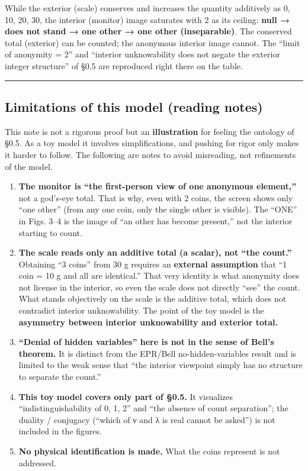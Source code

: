 \documentclass[11pt]{ltjsarticle}
\begin{document}
While the exterior (scale) conserves and increases the quantity
additively as 0, 10, 20, 30, the interior (monitor) image saturates with
2 as its ceiling: \textbf{null → does not stand → one other → one other
(inseparable)}. The conserved total (exterior) can be counted; the
anonymous interior image cannot. The ``limit of anonymity = 2'' and
``interior unknowability does not negate the exterior integer
structure'' of §0.5 are reproduced right there on the table.

\begin{center}\rule{0.5\linewidth}{0.5pt}\end{center}

\subsection{Limitations of this model (reading
notes)}\label{limitations-of-this-model-reading-notes}

This note is not a rigorous proof but an \textbf{illustration} for
feeling the ontology of §0.5. As a toy model it involves
simplifications, and pushing for rigor only makes it harder to follow.
The following are notes to avoid misreading, not refinements of the
model.

\begin{enumerate}
\def\labelenumi{\arabic{enumi}.}
\item
  \textbf{The monitor is ``the first-person view of one anonymous
  element,''} not a god's-eye total. That is why, even with 2 coins, the
  screen shows only ``one other'' (from any one coin, only the single
  other is visible). The ``ONE'' in Figs. 3--4 is the image of ``an
  other has become present,'' not the interior starting to count.
\item
  \textbf{The scale reads only an additive total (a scalar), not ``the
  count.''} Obtaining ``3 coins'' from 30 g requires an \textbf{external
  assumption} that ``1 coin = 10 g and all are identical.'' That very
  identity is what anonymity does not license in the interior, so even
  the scale does not directly ``see'' the count. What stands objectively
  on the scale is the additive total, which does not contradict interior
  unknowability. The point of the toy model is the \textbf{asymmetry
  between interior unknowability and exterior total.}
\item
  \textbf{``Denial of hidden variables'' here is not in the sense of
  Bell's theorem.} It is distinct from the EPR/Bell no-hidden-variables
  result and is limited to the weak sense that ``the interior viewpoint
  simply has no structure to separate the count.''
\item
  \textbf{This toy model covers only part of §0.5.} It visualizes
  ``indistinguishability of 0, 1, 2'' and ``the absence of count
  separation''; the duality / conjugacy (``which of ν and λ is real
  cannot be asked'') is not included in the figures.
\item
  \textbf{No physical identification is made.} What the coins represent
  is not addressed.
\end{enumerate}
\end{document}
